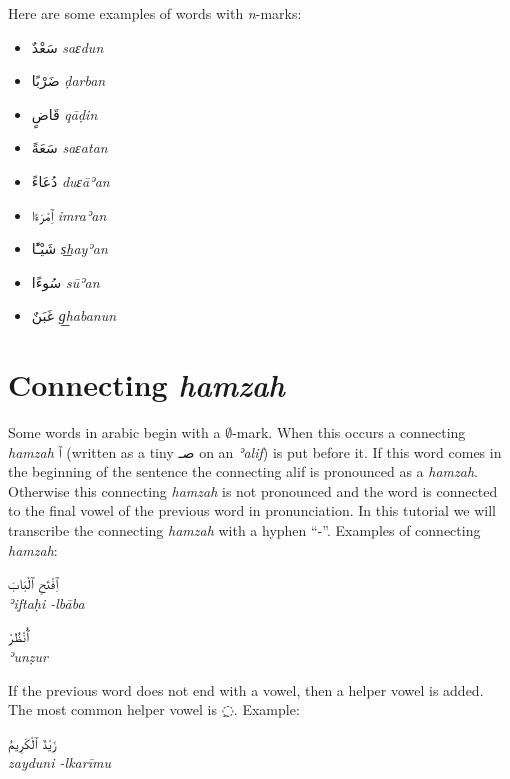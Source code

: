 \documentclass[
  10pt,
]{book}
\providecommand{\tightlist}{%
  \setlength{\itemsep}{0pt}\setlength{\parskip}{0pt}}
\begin{document}
Here are some examples of words with \emph{n}-marks:

\begin{itemize}
\tightlist
\item
  \foreignlanguage{arabic}{سَعْدٌ} \emph{saɛdun}
\item
  \foreignlanguage{arabic}{ضَرْبًا} \emph{ḍarban}
\item
  \foreignlanguage{arabic}{قَاضٍ} \emph{qāḍin}
\item
  \foreignlanguage{arabic}{سَعَةً} \emph{saɛatan}
\item
  \foreignlanguage{arabic}{دُعَاءً} \emph{duɛāʾan}
\item
  \foreignlanguage{arabic}{ٱِمْرَءًا} \emph{imraʾan}
\item
  \foreignlanguage{arabic}{شَيْـًٔا} \emph{s͟hayʾan}
\item
  \foreignlanguage{arabic}{سُوءًا} \emph{sūʾan}
\item
  \foreignlanguage{arabic}{غَبَنٌ} \emph{g͟habanun}
\end{itemize}

\section{\texorpdfstring{Connecting \emph{hamzah}}{Connecting hamzah}}\label{connecting-hamzah}

Some words in arabic begin with a \(\emptyset\)-mark. When this occurs a connecting \emph{hamzah} \foreignlanguage{arabic}{ٱ} (written as a tiny \foreignlanguage{arabic}{صـ} on an \emph{ʾalif}) is put before it. If this word comes in the beginning of the sentence the connecting alif is pronounced as a \emph{hamzah}. Otherwise this connecting \emph{hamzah} is not pronounced and the word is connected to the final vowel of the previous word in pronunciation. In this tutorial we will transcribe the connecting \emph{hamzah} with a hyphen \enquote{-}. Examples of connecting \emph{hamzah}:

\foreignlanguage{arabic}{ٱِفْتَحِ ٱلْبَابَ}\\
\emph{ʾiftaḥi -lbāba}

\foreignlanguage{arabic}{ٱُنْظُرْ}\\
\emph{ʾunẓur}

If the previous word does not end with a vowel, then a helper vowel is added. The most common helper vowel is \foreignlanguage{arabic}{◌ِ}. Example:

\foreignlanguage{arabic}{زَيْدٌ ٱلْکَرِيمُ}\\
\emph{zayduni -lkarīmu}
\end{document}
